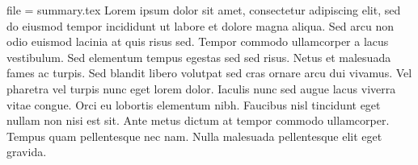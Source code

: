 
file = summary.tex
Lorem ipsum dolor sit amet, consectetur adipiscing elit, sed do eiusmod tempor incididunt ut labore et dolore magna aliqua. Sed arcu non odio euismod lacinia at quis risus sed. Tempor commodo ullamcorper a lacus vestibulum. Sed elementum tempus egestas sed sed risus. Netus et malesuada fames ac turpis. Sed blandit libero volutpat sed cras ornare arcu dui vivamus. Vel pharetra vel turpis nunc eget lorem dolor. Iaculis nunc sed augue lacus viverra vitae congue. Orci eu lobortis elementum nibh. Faucibus nisl tincidunt eget nullam non nisi est sit. Ante metus dictum at tempor commodo ullamcorper. Tempus quam pellentesque nec nam. Nulla malesuada pellentesque elit eget gravida.


